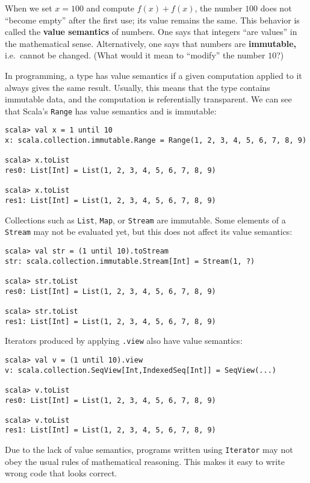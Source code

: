 When we set $x=100$ and compute $f(x)+f(x)$, the number $100$ does
not ``become empty'' after the first use; its value remains the
same. This behavior is called the \textbf{value
semantics} of numbers. One says that integers ``are values'' in
the mathematical sense. Alternatively, one says that numbers are \textbf{immutable,}
i.e.~cannot be changed. (What would it mean to ``modify'' the number
$10$?)

In programming, a type has value semantics if a given computation
applied to it always gives the same result. Usually, this means that
the type contains immutable data, and the computation is referentially
transparent. We can see that Scala's \lstinline!Range! has value
semantics and is immutable:
\begin{lstlisting}
scala> val x = 1 until 10
x: scala.collection.immutable.Range = Range(1, 2, 3, 4, 5, 6, 7, 8, 9)

scala> x.toList
res0: List[Int] = List(1, 2, 3, 4, 5, 6, 7, 8, 9)

scala> x.toList
res1: List[Int] = List(1, 2, 3, 4, 5, 6, 7, 8, 9) 
\end{lstlisting}
Collections such as \lstinline!List!, \lstinline!Map!, or \lstinline!Stream!
are immutable. Some elements of a \lstinline!Stream! may not be evaluated
yet, but this does not affect its value semantics:
\begin{lstlisting}
scala> val str = (1 until 10).toStream
str: scala.collection.immutable.Stream[Int] = Stream(1, ?)

scala> str.toList
res0: List[Int] = List(1, 2, 3, 4, 5, 6, 7, 8, 9)

scala> str.toList
res1: List[Int] = List(1, 2, 3, 4, 5, 6, 7, 8, 9) 
\end{lstlisting}
Iterators produced by applying \lstinline!.view! also have value
semantics:
\begin{lstlisting}
scala> val v = (1 until 10).view
v: scala.collection.SeqView[Int,IndexedSeq[Int]] = SeqView(...)

scala> v.toList
res0: List[Int] = List(1, 2, 3, 4, 5, 6, 7, 8, 9)

scala> v.toList
res1: List[Int] = List(1, 2, 3, 4, 5, 6, 7, 8, 9)
\end{lstlisting}

Due to the lack of value semantics, programs written using \lstinline!Iterator!
may not obey the usual rules of mathematical reasoning. This
makes it easy to write wrong code that looks correct.

